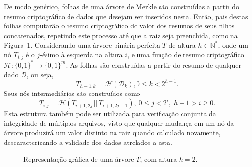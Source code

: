 \documentclass[12pt]{report}
\newcommand{\hash}[2][]{\mathcal{H}^{#1}(#2)}
\newcommand{\concat}{\, \vert \vert \,}
\newcommand{\binwds}[1]{\{0, 1\}^{#1}}
\begin{document}
De modo genérico, folhas de uma árvore de Merkle são construídas a partir do resumo criptográfico de dados que desejam ser inseridos nesta. Então, pais destas folhas computarão o resumo criptográfico do valor dos resumos de seus filhos concatenados, repetindo este processo até que a raiz seja preenchida, como na Figura~\ref{fig:4}. Considerando uma árvore binária perfeita $T$ de altura $h \in \mathbb{N}^{*}$, onde um nó $T_{i,j}$ é o $j$-ésimo à esquerda na altura $i$, e uma função de resumo criptográfico $\mathcal{H} : \binwds{*} \longrightarrow \binwds{m}$. As folhas são construídas a partir do resumo de qualquer dado $\mathcal{D}$, ou seja, \begin{equation}T_{h - 1, k} = \mathcal{H}(\mathcal{D}_k), 0 \leq k < 2^{h - 1}.\end{equation} Seus nós intermediários são construídos como \begin{equation}T_{i,j} = \mathcal{H}(T_{i + 1, 2j} \concat T_{i + 1, 2j + 1}), \; 0 \leq j < 2^{i}, \; h - 1 > i \geq 0.\end{equation} Esta estrutura também pode ser utilizada para verificação conjunta da integridade de múltiplos arquivos, visto que qualquer mudança em um nó da árvore produzirá um valor distinto na raiz quando calculado novamente, descaracterizando a validade dos dados atrelados a esta.

\begin{figure}
    \centering
    \caption{Representação gráfica de uma árvore $T$, com altura $h = 2$.}
    \label{fig:4}
\end{figure}
\end{document}
